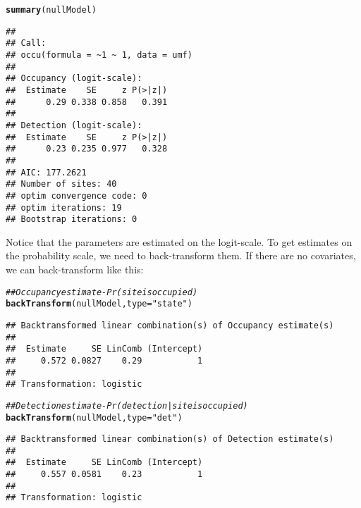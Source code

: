 \documentclass[12pt]{article}\usepackage[]{graphicx}\usepackage[]{color}
\makeatletter
\newcommand{\hlstr}[1]{\textcolor[rgb]{0.192,0.494,0.8}{#1}}%
\newcommand{\hlcom}[1]{\textcolor[rgb]{0.678,0.584,0.686}{\textit{#1}}}%
\newcommand{\hlstd}[1]{\textcolor[rgb]{0.345,0.345,0.345}{#1}}%
\newcommand{\hlkwc}[1]{\textcolor[rgb]{0.333,0.667,0.333}{#1}}%
\newcommand{\hlkwd}[1]{\textcolor[rgb]{0.737,0.353,0.396}{\textbf{#1}}}%
\newenvironment{kframe}{%
 \def\at@end@of@kframe{}%
 \ifinner\ifhmode%
  \def\at@end@of@kframe{\end{minipage}}%
  \begin{minipage}{\columnwidth}%
 \fi\fi%
 \def\FrameCommand##1{\hskip\@totalleftmargin \hskip-\fboxsep
 \colorbox{shadecolor}{##1}\hskip-\fboxsep
     \hskip-\linewidth \hskip-\@totalleftmargin \hskip\columnwidth}%
 \MakeFramed {\advance\hsize-\width
   \@totalleftmargin\z@ \linewidth\hsize
   \@setminipage}}%
 {\par\unskip\endMakeFramed%
 \at@end@of@kframe}
\newenvironment{knitrout}{}{} %
\makeatother
\begin{document}
\begin{knitrout}
\color{fgcolor}\begin{kframe}
\begin{alltt}
\hlkwd{summary}\hlstd{(nullModel)}
\end{alltt}
\begin{verbatim}
## 
## Call:
## occu(formula = ~1 ~ 1, data = umf)
## 
## Occupancy (logit-scale):
##  Estimate    SE     z P(>|z|)
##      0.29 0.338 0.858   0.391
## 
## Detection (logit-scale):
##  Estimate    SE     z P(>|z|)
##      0.23 0.235 0.977   0.328
## 
## AIC: 177.2621 
## Number of sites: 40
## optim convergence code: 0
## optim iterations: 19 
## Bootstrap iterations: 0
\end{verbatim}
\end{kframe}
\end{knitrout}

Notice that the parameters are estimated on the logit-scale. To get
estimates on the probability scale, we need to back-transform them. If
there are no covariates, we can back-transform like this: 

\begin{knitrout}
\color{fgcolor}\begin{kframe}
\begin{alltt}
\hlcom{## Occupancy estimate - Pr(site is occupied)}
\hlkwd{backTransform}\hlstd{(nullModel,} \hlkwc{type}\hlstd{=}\hlstr{"state"}\hlstd{)}
\end{alltt}
\begin{verbatim}
## Backtransformed linear combination(s) of Occupancy estimate(s)
## 
##  Estimate     SE LinComb (Intercept)
##     0.572 0.0827    0.29           1
## 
## Transformation: logistic
\end{verbatim}
\begin{alltt}
\hlcom{## Detection estimate - Pr(detection | site is occupied)}
\hlkwd{backTransform}\hlstd{(nullModel,} \hlkwc{type}\hlstd{=}\hlstr{"det"}\hlstd{)}
\end{alltt}
\begin{verbatim}
## Backtransformed linear combination(s) of Detection estimate(s)
## 
##  Estimate     SE LinComb (Intercept)
##     0.557 0.0581    0.23           1
## 
## Transformation: logistic
\end{verbatim}
\end{kframe}
\end{knitrout}
\end{document}
